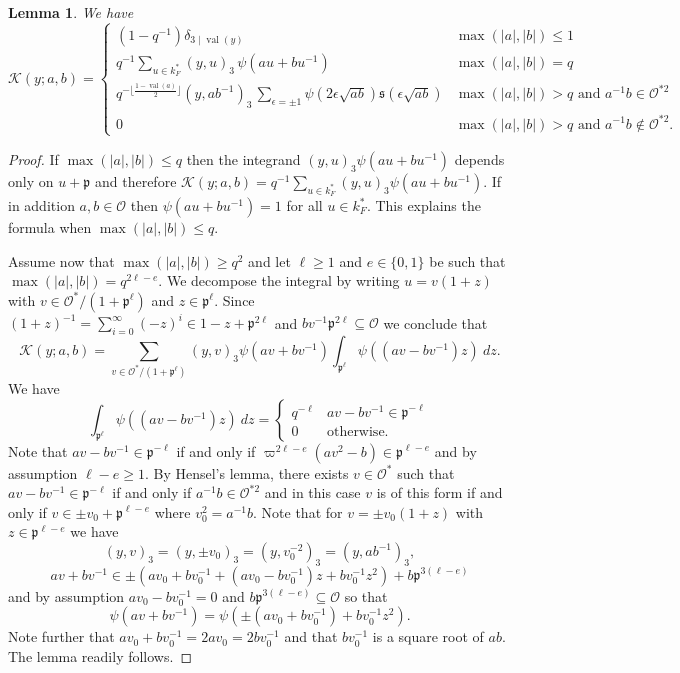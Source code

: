 \documentclass[12pt]{amsart}
\newcommand{\abs}[1]{\left|{#1}\right|}
\newcommand{\p}{\mathfrak{p}}
\renewcommand{\O}{\mathcal{O}}
\newcommand{\sq}{\mathfrak{s}}
\newcommand{\val}{{\operatorname{val}}}
\newcommand{\Kl}{\mathcal{K}}
\newtheorem{lemma}[theorem]{Lemma}
\theoremstyle{remark}
\begin{document}
\begin{lemma}\label{lem kl int}
We have
\[
\Kl(y;a,b)=\begin{cases} (1-q^{-1})\delta_{3\mid \val(y)} & \max(\abs{a},\abs{b})\le 1 \\
q^{-1}\sum_{u\in k_F^*}(y,u)_3\,\psi(au+bu^{-1}) &  \max(\abs{a},\abs{b})=q \\
q^{-\lfloor\frac{1-\val(a)}2\rfloor}(y,ab^{-1})_3\,\sum_{\epsilon=\pm 1} \psi(2\epsilon\sqrt{ab})\sq(\epsilon\sqrt{ab})& \max(\abs{a},\abs{b})>q \text{ and }a^{-1}b\in \O^{*2} \\
0 & \max(\abs{a},\abs{b})>q \text{ and }a^{-1}b\not\in \O^{*2}.
 \end{cases}
\]
\end{lemma}
\begin{proof}
If $\max(\abs{a},\abs{b})\le q$ then the integrand $(y,u)_3\psi(au+bu^{-1})$ depends only on $u+\p$ and therefore $\Kl(y;a,b)=q^{-1}\sum_{u\in k_F^*}(y,u)_3\psi(au+bu^{-1}) $. If in addition $a,b\in\O$ then $\psi(au+bu^{-1})=1$ for all $u\in k_F^*$. This explains the formula when $\max(\abs{a},\abs{b})\le q$.

Assume now that $\max(\abs{a},\abs{b})\ge q^2$ and let $\ell\ge 1$ and $e\in\{0,1\}$ be such that $\max(\abs{a},\abs{b}) = q^{2\ell -e}$. We decompose the integral by writing $u=v(1+z)$ with $v\in \O^*/(1+\p^\ell)$ and $z\in \p^\ell$. Since $(1+z)^{-1}=\sum_{i=0}^\infty (-z)^i\in 1-z+\p^{2\ell}$ and $bv^{-1}\p^{2\ell}\subseteq \O$ we conclude that
\[
\Kl(y;a,b)=\sum_{v\in \O^*/(1+\p^\ell)} (y,v)_3\psi(av+bv^{-1})\int_{\p^{\ell}} \psi((av-bv^{-1})z)\ dz. 
\]
We have 
\[
\int_{\p^{\ell}} \psi((av-bv^{-1})z)\ dz=\begin{cases}
q^{-\ell} & av-bv^{-1}\in \p^{-\ell} \\ 
0 & \text{otherwise.}
\end{cases}
\]
Note that $av-bv^{-1}\in \p^{-\ell}$ if and only if $\varpi^{2\ell-e}(av^2-b)\in\p^{\ell-e}$ and by assumption $\ell-e\ge 1$. 
By Hensel's lemma, there exists $v\in \O^*$ such that $av-bv^{-1}\in \p^{-\ell}$ if and only if $a^{-1}b \in\O^{*2}$ and in this case $v$ is of this form if and only if $v\in \pm v_0+ \p^{\ell-e}$ where $v_0^2=a^{-1}b$.
Note that for $v=\pm v_0(1+z)$ with $z\in\p^{\ell-e}$ we have
\[
(y,v)_3=(y,\pm v_0)_3=(y,v_0^{-2})_3=(y,ab^{-1})_3,
\]
\[
av+bv^{-1}\in \pm(av_0+bv_0^{-1}+(av_0-bv_0^{-1})z+bv_0^{-1}z^2)+b\p^{3(\ell-e)}
\]
and by assumption $av_0-bv_0^{-1}=0$ and $b\p^{3(\ell-e)}\subseteq \O$ so that
\[
\psi(av+bv^{-1})=\psi(\pm(av_0+bv_0^{-1})+bv_0^{-1}z^2).
\]
Note further that $av_0+bv_0^{-1}=2av_0=2bv_0^{-1}$ and that $bv_0^{-1}$ is a square root of $ab$. The lemma readily follows.
\end{proof}
\end{document}
